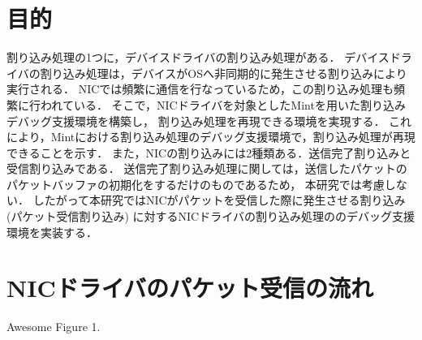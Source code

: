 \documentclass[tanilab-enum]{graduate}
\begin{document}
\section{目的}
割り込み処理の1つに，デバイスドライバの割り込み処理がある．
デバイスドライバの割り込み処理は，デバイスがOSへ非同期的に発生させる割り込みにより
実行される．
NICでは頻繁に通信を行なっているため，この割り込み処理も頻繁に行われている．
そこで，NICドライバを対象としたMintを用いた割り込みデバッグ支援環境を構築し，
割り込み処理を再現できる環境を実現する．
これにより，Mintにおける割り込み処理のデバッグ支援環境で，割り込み処理が再現できることを示す．
また，NICの割り込みには2種類ある．送信完了割り込みと受信割り込みである．
送信完了割り込み処理に関しては，送信したパケットの
パケットバッファの初期化をするだけのものであるため，
本研究では考慮しない．
したがって本研究ではNICがパケットを受信した際に発生させる割り込み(パケット受信割り込み)
に対するNICドライバの割り込み処理ののデバッグ支援環境を実装する．
\section{NICドライバのパケット受信の流れ}
{Awesome Figure 1.}
\end{document}
